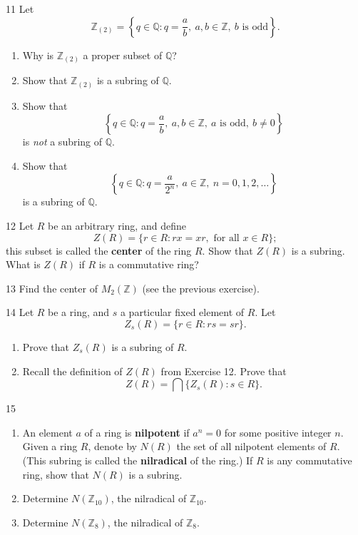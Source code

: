 \begin{problem}{11}
    Let
    \[\mathbb{Z}_{(2)} = \left\{q \in \mathbb{Q} : q = \frac{a}{b},\ a, b \in \mathbb{Z},\ b \text{ is odd}\right\}.\]
    \begin{enumerate}
        \item[(a)] Why is $\mathbb{Z}_{(2)}$ a proper subset of $\mathbb{Q}$?
        \item[(b)] Show that $\mathbb{Z}_{(2)}$ is a subring of $\mathbb{Q}$.
        \item[(c)] Show that
        \[\left\{q \in \mathbb{Q} : q = \frac{a}{b},\ a, b \in \mathbb{Z},\ a \text{ is odd},\ b \neq 0\right\}\]
        is \emph{not} a subring of $\mathbb{Q}$.
        \item[(d)] Show that
        \[\left\{q \in \mathbb{Q} : q = \frac{a}{2^n},\ a \in \mathbb{Z},\ n = 0, 1, 2, \ldots\right\}\]
        is a subring of $\mathbb{Q}$.
    \end{enumerate}
\end{problem}
\unsolved

\begin{problem}{12}
    Let $R$ be an arbitrary ring, and define
    \[Z(R) = \{r \in R : rx = xr, \text{ for all } x \in R\};\]
    this subset is called the \textbf{center} of the ring $R$. Show that $Z(R)$ is a
    subring. What is $Z(R)$ if $R$ is a commutative ring?
\end{problem}
\unsolved

\begin{problem}{13}
    Find the center of $M_2(\mathbb{Z})$ (see the previous exercise).
\end{problem}
\unsolved

\begin{problem}{14}
    Let $R$ be a ring, and $s$ a particular fixed element of $R$. Let
    \[Z_s(R) = \{r \in R : rs = sr\}.\]
    \begin{enumerate}
        \item[(a)] Prove that $Z_s(R)$ is a subring of $R$.
        \item[(b)] Recall the definition of $Z(R)$ from Exercise 12. Prove that
        \[Z(R) = \bigcap \{Z_s(R) : s \in R\}.\]
    \end{enumerate}
\end{problem}
\unsolved

\begin{problem}{15}
    \begin{enumerate}
        \item[(a)] An element $a$ of a ring is \textbf{nilpotent} if $a^n = 0$ for some
        positive integer $n$. Given a ring $R$, denote by $N(R)$ the set of all nilpotent
        elements of $R$. (This subring is called the \textbf{nilradical} of the ring.)
        If $R$ is any commutative ring, show that $N(R)$ is a subring.
        \item[(b)] Determine $N(\mathbb{Z}_{10})$, the nilradical of $\mathbb{Z}_{10}$.
        \item[(c)] Determine $N(\mathbb{Z}_8)$, the nilradical of $\mathbb{Z}_8$.
    \end{enumerate}
\end{problem}
\unsolved

